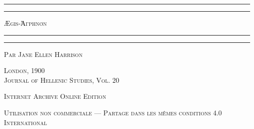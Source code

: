 \documentclass[a4paper, 11pt, oneside, polutonikogreek, french]{article}
\begin{document}
\bfseries
\pagestyle{plain} %

\renewcommand\thefootnote{{\bfseries\color{White}{\arabic{footnote}}}}
\let\oldfootnote\footnote
    \renewcommand{\footnote}[1]{\oldfootnote{{\normalsize\bfseries\color{White}#1}}}
\begin{titlepage} %
	\centering %

	
	\rule{\textwidth}{1.6pt}\vspace*{-\baselineskip}\vspace*{2pt} %
	\rule{\textwidth}{0.4pt} %
	
	\vspace{1\baselineskip} %
	
	{\scshape \Huge Ægis-Ἀγρηνόν}
	
	\vspace{1\baselineskip} %

	\rule{\textwidth}{0.4pt}\vspace*{-\baselineskip}\vspace{3.2pt} %
	\rule{\textwidth}{1.6pt} %
	
	\vspace{1\baselineskip} %
	

 	\vspace*{1\baselineskip} %

	{\scshape \Large Par Jane Ellen Harrison} %

 	\vspace*{1\baselineskip} %

        \vspace*{\fill}

	\vspace{1\baselineskip}

	{\scshape London, 1900 \\Journal of Hellenic Studies, Vol. 20}
		
	\vspace{0.5\baselineskip} %

        \scshape Internet Archive Online Edition%
	
	{\scshape\small Utilisation non commerciale --- Partage dans les mêmes conditions 4.0 International} %
\end{titlepage}
\setlength{\parskip}{1mm plus1mm minus1mm}
\clearpage
\Large
\end{document}
